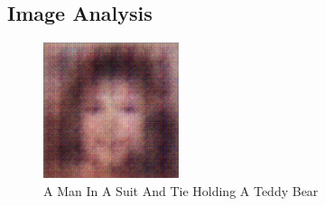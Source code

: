 \documentclass{article}%
\begin{document}
%
\subsection{Image Analysis}%
\label{subsec:ImageAnalysis}%


\begin{figure}[h!]%
\centering%
\includegraphics[width=150px]{500_fake_images/samples_5_162.png}%
\caption{A Man In A Suit And Tie Holding A Teddy Bear}%
\end{figure}

%
\end{document}
